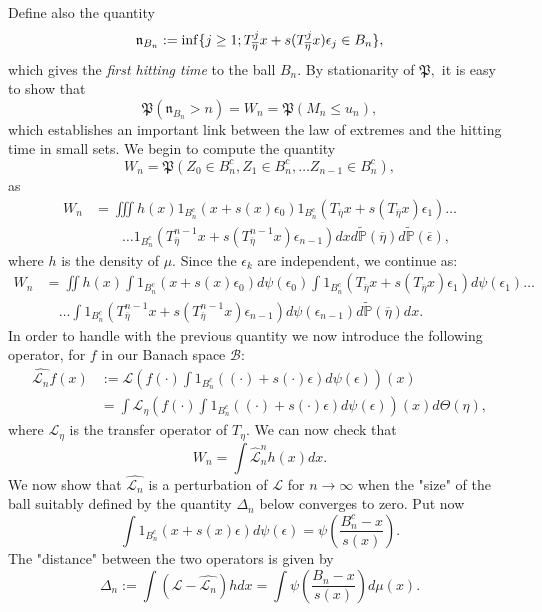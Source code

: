 \documentclass{article}
\newcommand{\1}{\mathbbm{1}}
\newtheorem{remark}[theorem]{Remark}
\begin{document}
Define also the quantity
$$
\frak{n}_{B_n}:=\inf\{j\ge 1; T^{j}_{\overline{\eta}}x+s(T^{j}_{\overline{\eta}}x)\epsilon_{j}\in B_n\},
$$
which gives the {\em first hitting time} to the ball $B_n.$ By stationarity of $\mathfrak{P},$ it is easy to show that 
\begin{equation}\label{VIP}
\mathfrak{P}(\mathfrak{n}_{B_n}>n)=W_n=\mathfrak{P}(M_n\le u_n),
\end{equation}
which establishes an important link between the law of extremes and the hitting time in small sets.
We  begin to compute the quantity
\begin{equation}\label{fevt}
W_n=\mathfrak{P}(Z_0\in B_n^c, Z_1\in B_n^c,\dots Z_{n-1}\in B_n^c),
\end{equation}
as
\begin{align*}
W_n&=\iiint h(x)1_{B_n^c}(x+s(x)\epsilon_0)1_{B_n^c}(T_{\overline{\eta}}x+s(T_{\overline{\eta}}x)\epsilon_1)\dots \\
&\quad\quad\dots 1_{B_n^c}(T^{n-1}_{\overline{\eta}}x+s(T^{n-1}_{\overline{\eta}}x)\epsilon_{n-1})dx d\tilde{\mathbb{P}}(\overline{\eta})d\tilde{\mathbb{P}}(\overline{\epsilon}),\label{mevt}
\end{align*}
where $h$ is the density of $\mu.$
Since the $\epsilon_k$ are independent, we continue as:
\begin{align*}
W_n&=\iint h(x) \int 1_{B_n^c}(x+s(x)\epsilon_0)d\psi (\epsilon_0)\int 1_{B_n^c}(T_{\overline{\eta}}x+s(T_{\overline{\eta}}x)\epsilon_1)d\psi(\epsilon_1)\dots \\
&\quad\dots\int 1_{B_n^c}(T^{n-1}_{\overline{\eta}}x+s(T^{n-1}_{\overline{\eta}}x)\epsilon_{n-1})d\psi (\epsilon_{n-1})d\tilde{\mathbb{P}}(\overline{\eta})dx.
\end{align*}
In order to handle with the previous quantity we now introduce the following operator, for $f$ in our Banach space $\mathcal{B}$:
\begin{align*}
\hat{\mathcal{L}_n}f(x)&:=\mathcal{L}\left(f(\cdot) \int 1_{B_n^c}((\cdot)+s(\cdot)\epsilon)d\psi (\epsilon)\right)(x)\\
&=\int \mathcal{L}_{\eta}\left(f(\cdot) \int 1_{B_n^c}((\cdot)+s(\cdot)\epsilon)d\psi (\epsilon)\right)(x)d\Theta(\eta),
\end{align*}
where $\mathcal{L}_{\eta}$ is the transfer operator of $T_{\eta}.$
We can now check that
\begin{equation}\label{vj}
W_n=\int \hat{\mathcal{L}}_n^n h(x) dx.
\end{equation}
We now show that $\hat{\mathcal{L}_n}$ is a perturbation of $\mathcal{L}$ for $n\rightarrow \infty$ 
 when the "size" of the ball suitably defined by the quantity $\Delta_n$ below  converges to zero.   Put now
$$
\int 1_{B_n^c}(x+s(x)\epsilon)d\psi (\epsilon)=\psi\left(\frac{B^c_n-x}{s(x)}\right).
$$
The "distance" between the two operators is given by
$$
\Delta_n:=\int (\mathcal{L}-\hat{\mathcal{L}_n})hdx=\int \psi\left(\frac{B_n-x}{s(x)}\right)d\mu(x).
$$
\end{document}
